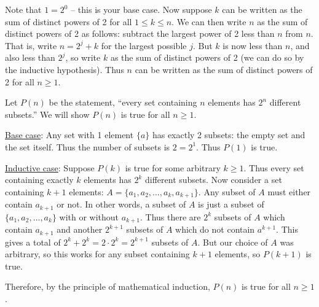 \protect \documentclass [10pt]{exam}
\renewenvironment{Ans}[1]{\setcounter{question}{#1}\addtocounter{question}{-1}\question }{}
\begin{document}
\begin{questions}
\begin{Ans}{10}
\end{Ans}
\begin{Ans}{11}
		Note that $1 = 2^0$ -- this is your base case.  Now suppose $k$ can be written as the sum of distinct powers of 2 for all $1\le k \le n$.  We can then write $n$ as the sum of distinct powers of 2 as follows: subtract the largest power of 2 less than $n$ from $n$.  That is, write $n = 2^j + k$ for the largest possible $j$.  But $k$ is now less than $n$, and also less than $2^j$, so write $k$ as the sum of distinct powers of 2 (we can do so by the inductive hypothesis).  Thus $n$ can be written as the sum of distinct powers of 2 for all $n \ge 1$.
	
\end{Ans}
\begin{Ans}{12}
		Let $P(n)$ be the statement, ``every set containing $n$ elements has $2^n$ different subsets.''  We will show $P(n)$ is true for all $n \ge 1$.

		\underline{Base case}: Any set with 1 element $\{a\}$ has exactly 2 subsets: the empty set and the set itself.  Thus the number of subsets is $2= 2^1$.  Thus $P(1)$ is true.

		\underline{Inductive case}: Suppose $P(k)$ is true for some arbitrary $k \ge 1$.  Thus every set containing exactly $k$ elements has $2^k$ different subsets.  Now consider a set containing $k+1$ elements: $A = \{a_1, a_2, \ldots, a_k, a_{k+1}\}$.  Any subset of $A$ must either contain $a_{k+1}$ or not.  In other words, a subset of $A$ is just a subset of $\{a_1, a_2,\ldots, a_k\}$ with or without $a_{k+1}$.  Thus there are $2^k$ subsets of $A$ which contain $a_{k+1}$ and another $2^{k+1}$ subsets of $A$ which do not contain $a^{k+1}$.  This gives a total of $2^k + 2^k = 2\cdot 2^k = 2^{k+1}$ subsets of $A$.  But our choice of $A$ was arbitrary, so this works for any subset containing $k+1$ elements, so $P(k+1)$ is true.

		Therefore, by the principle of mathematical induction, $P(n)$ is true for all $n \ge 1$.
	
\end{Ans}
 \protect \end {questions} \par \protect 
\end{document}
